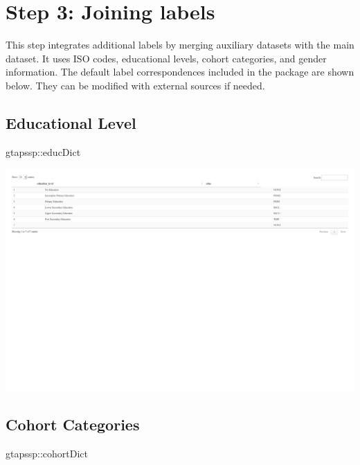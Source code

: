 \documentclass[
  letterpaper,
  DIV=11,
  numbers=noendperiod]{scrartcl}
\newenvironment{Shaded}{}{}
\newcommand{\NormalTok}[1]{\textcolor[rgb]{0.12,0.11,0.11}{#1}}
\newcommand{\SpecialCharTok}[1]{\textcolor[rgb]{0.24,0.68,0.91}{#1}}
\begin{document}
\section{Step 3: Joining labels}\label{step-3-joining-labels}

This step integrates additional labels by merging auxiliary datasets
with the main dataset. It uses ISO codes, educational levels, cohort
categories, and gender information. The default label correspondences
included in the package are shown below. They can be modified with
external sources if needed.

\subsection{Educational Level}

\begin{Shaded}
\begin{Highlighting}[]
\NormalTok{gtapssp}\SpecialCharTok{::}\NormalTok{educDict}
\end{Highlighting}
\end{Shaded}

\includegraphics{index_files/figure-pdf/unnamed-chunk-18-1.pdf}

\subsection{Cohort Categories}

\begin{Shaded}
\begin{Highlighting}[]
\NormalTok{gtapssp}\SpecialCharTok{::}\NormalTok{cohortDict}
\end{Highlighting}
\end{Shaded}
\end{document}
